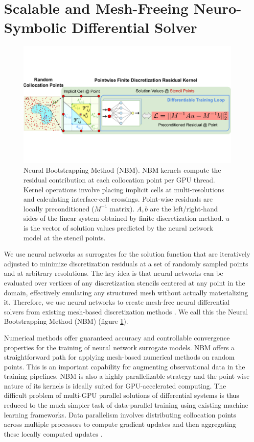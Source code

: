 \documentclass{article}
\begin{document}
\section{Scalable and Mesh-Freeing Neuro-Symbolic Differential Solver}

\begin{figure}
\centering
\includegraphics[width=\textwidth]{./figures/jax_dips_paper_v11}
\caption{Neural Bootstrapping Method (NBM). NBM kernels compute the residual contribution at each collocation point per GPU thread. Kernel operations involve placing implicit cells at multi-resolutions and calculating interface-cell crossings. Point-wise residuals are locally preconditioned ($M^{-1}$ matrix). $A,b$ are the left/right-hand sides of the linear system obtained by finite discretization method. $u$ is the vector of solution values predicted by the neural network model at the stencil points.}
\label{fig:nbm}
\end{figure}
We use neural networks as surrogates for the solution function that are iteratively adjusted to minimize discretization residuals at a set of randomly sampled points and at arbitrary resolutions. The key idea is that neural networks can be evaluated over vertices of any discretization stencils centered at any point in the domain, effectively emulating any structured mesh without actually materializing it. Therefore, we use neural networks to create mesh-free neural differential solvers from existing mesh-based discretization methods . We call this the Neural Bootstrapping Method (NBM) (figure \ref{fig:nbm}).

Numerical methods offer guaranteed accuracy and controllable convergence properties for the training of neural network surrogate models. NBM offers a straightforward path for applying mesh-based numerical methods on random points. This is an important capability for augmenting observational data in the training pipelines. NBM is also a highly parallelizable strategy and the point-wise nature of its kernels is ideally suited for GPU-accelerated computing. The difficult problem of multi-GPU parallel solutions of differential systems is thus reduced to the much simpler task of data-parallel training using existing machine learning frameworks. Data parallelism involves distributing collocation points across multiple processors to compute gradient updates and then aggregating these locally computed updates \cite{shallue2018measuring}.
\end{document}
